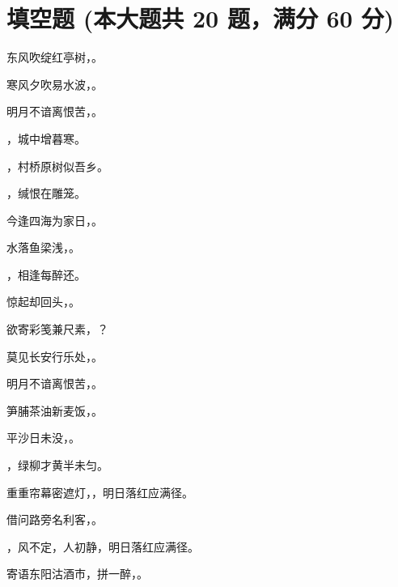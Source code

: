 \documentclass[12pt, a4paper, addpoints, answers]{exam}
\begin{document}
\pagestyle{headandfoot}

\begin{center}
\end{center}
\vspace{5mm}

\normalsize
\vspace{5mm}

\section{\normalsize{填空题 (本大题共 20 题，满分 60 分)}}
\hspace{1.5cm}

\begin{questions}
\question[3] 东风吹绽红亭树，\fillin 。

\question[3] 寒风夕吹易水波，\fillin 。

\question[3] 明月不谙离恨苦，\fillin 。

\question[3] \fillin ，城中增暮寒。

\question[3] \fillin ，村桥原树似吾乡。

\question[3] \fillin ，缄恨在雕笼。

\question[3] 今逢四海为家日，\fillin 。

\question[3] 水落鱼梁浅，\fillin 。

\question[3] \fillin ，相逢每醉还。

\question[3] 惊起却回头，\fillin 。

\question[3] 欲寄彩笺兼尺素，\fillin ？

\question[3] 莫见长安行乐处，\fillin 。

\question[3] 明月不谙离恨苦，\fillin 。

\question[3] 笋脯茶油新麦饭，\fillin 。

\question[3] 平沙日未没，\fillin 。

\question[3] \fillin ，绿柳才黄半未匀。

\question[3] 重重帘幕密遮灯，\fillin ，明日落红应满径。

\question[3] 借问路旁名利客，\fillin 。

\question[3] \fillin ，风不定，人初静，明日落红应满径。

\question[3] 寄语东阳沽酒市，拼一醉，\fillin 。

\end{questions}
\end{document}

